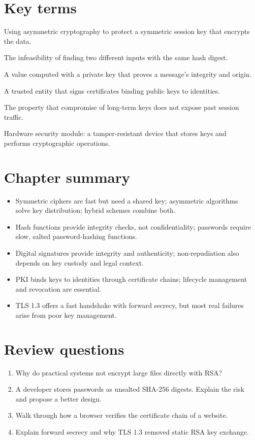 \section*{Key terms}
\begin{description}[style=nextline,leftmargin=1.2em]
  \item[Hybrid encryption] Using asymmetric cryptography to protect a symmetric session key that encrypts the data.
  \item[Collision resistance] The infeasibility of finding two different inputs with the same hash digest.
  \item[Digital signature] A value computed with a private key that proves a message's integrity and origin.
  \item[Certificate authority] A trusted entity that signs certificates binding public keys to identities.
  \item[Forward secrecy] The property that compromise of long-term keys does not expose past session traffic.
  \item[HSM] Hardware security module: a tamper-resistant device that stores keys and performs cryptographic operations.
\end{description}

\section*{Chapter summary}
\begin{itemize}
  \item Symmetric ciphers are fast but need a shared key; asymmetric algorithms solve key distribution; hybrid schemes combine both.
  \item Hash functions provide integrity checks, not confidentiality; passwords require slow, salted password-hashing functions.
  \item Digital signatures provide integrity and authenticity; non-repudiation also depends on key custody and legal context.
  \item PKI binds keys to identities through certificate chains; lifecycle management and revocation are essential.
  \item TLS 1.3 offers a fast handshake with forward secrecy, but most real failures arise from poor key management.
\end{itemize}

\section*{Review questions}
\begin{enumerate}
  \item Why do practical systems not encrypt large files directly with RSA?
  \item A developer stores passwords as unsalted SHA-256 digests. Explain the risk and propose a better design.
  \item Walk through how a browser verifies the certificate chain of a website.
  \item Explain forward secrecy and why TLS 1.3 removed static RSA key exchange.
\end{enumerate}
